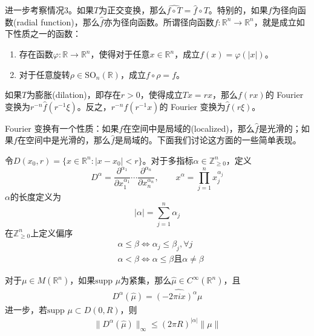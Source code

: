 \documentclass[lang = cn, %
scheme = chinese          %
]
{elegantbook}             %
\newcommand{\R}{\mathbb{R}}            %
\newcommand{\Z}{\mathbb{Z}}            %
\newcommand{\sub}{\subset}             %
\newcommand{\supp}{\text{supp }}
\begin{document}
进一步考察情况3。如果$T$为正交变换，那么$\widehat{f\circ T}=\widehat{f}\circ T$。特别的，如果$f$为径向函数(radial function)，那么$\widehat{f}$亦为径向函数。所谓径向函数$f:\R^n\to\R^n$，就是成立如下性质之一的函数：
\begin{enumerate}
	\item 存在函数$\varphi:\R\to\R^n$，使得对于任意$x\in\R^n$，成立$f(x)=\varphi(|x|)$。
	\item 对于任意旋转$\rho\in\text{SO}_n(\R)$，成立$f\circ\rho=f$。
\end{enumerate}
如果$T$为膨胀(dilation)，即存在$r>0$，使得成立$Tx=rx$，那么$f(rx)$的 Fourier 变换为$r^{-n}\widehat{f}(r^{-1}\xi)$。反之，$r^{-n}f(r^{-1}x)$的 Fourier 变换为$\widehat{f}(r\xi)$。

Fourier 变换有一个性质：如果$f$在空间中是局域的(localized)，那么$\widehat{f}$是光滑的；如果$f$在空间中是光滑的，那么$\widehat{f}$是局域的。下面我们讨论这方面的一些简单表现。

令$D(x_0,r)=\{ x\in\R^n:|x-x_0|<r \}$。对于多指标$\alpha\in\Z_{\ge 0}^n$，定义
\[
D^\alpha=\frac{\partial^{\alpha_1}}{\partial x_1^{\alpha_1}}\cdots \frac{\partial^{\alpha_n}}{\partial x_n^{\alpha_n}},\qquad
x^\alpha=\prod_{j=1}^{n}x_j^{\alpha_j}
\]
$\alpha$的长度定义为
\[
|\alpha|=\sum_{j=1}^{n}\alpha_j
\]
在$\Z_{\ge 0}^n$上定义偏序
\begin{align*}
	& \alpha\le\beta \iff \alpha_j\le \beta_j,\forall j \\
	& \alpha<\beta \iff \alpha\le\beta\text{且}\alpha\ne\beta
\end{align*}

\begin{proposition}
	对于$\mu\in M(\R^n)$，如果$\supp \mu$为紧集，那么$\widehat{\mu}\in C^{\infty}(\R^n)$，且
	\begin{gather}
		\label{7式}
		D^{\alpha}(\widehat{\mu})
		=\widehat{(-2\pi i x)^{\alpha}\mu}
	\end{gather}
	进一步，若$\supp \mu\sub D(0,R)$，则
	\begin{gather}
		\label{8式}
		\|D^{\alpha}(\widehat{\mu})\|_{\infty}
		\le (2\pi R)^{|\alpha|}\|\mu\|
	\end{gather}
\end{proposition}
\end{document}

